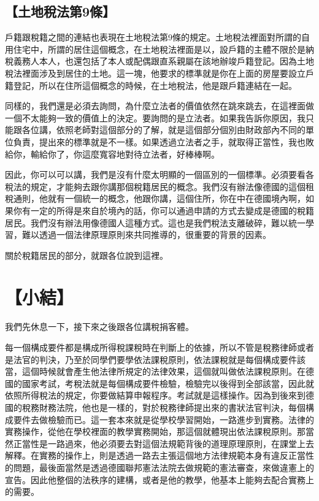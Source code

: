 \documentclass[]{ctexbook}
\begin{document}
\hypertarget{ux571fux5730ux7a05ux6cd5ux7b2c9ux689d}{%
\subsection{【土地稅法第9條】}\label{ux571fux5730ux7a05ux6cd5ux7b2c9ux689d}}

戶籍跟稅籍之間的連結也表現在土地稅法第9條的規定。土地稅法裡面對所謂的自用住宅中，所謂的居住這個概念，在土地稅法裡面是以，設戶籍的主體不限於是納稅義務人本人，也還包括了本人或配偶跟直系親屬在該地辦竣戶籍登記。因為土地稅法裡面涉及到居住的土地。這一塊，他要求的標準就是你在上面的房屋要設立戶籍登記，所以在住所這個概念的時候，在土地稅法，他是跟戶籍連結在一起。

同樣的，我們還是必須去詢問，為什麼立法者的價值依然在跳來跳去，在這裡面做一個不太能夠一致的價值上的決定。要詢問的是立法者。如果我告訴你原因，我只能跟各位講，依照老師對這個部分的了解，就是這個部分個別由財政部內不同的單位負責，提出來的標準就是不一樣。如果透過立法者之手，就取得正當性，我也敗給你，輸給你了，你這麼寬容地對待立法者，好棒棒啊。

因此，你可以可以講，我們是沒有什麼太明顯的一個區別的一個標準。必須要看各稅法的規定，才能夠去跟你講那個稅籍居民的概念。我們沒有辦法像德國的這個租稅通則，他就有一個統一的概念，他跟你講，這個住所，你在中在德國境內啊，如果你有一定的所得是來自於境內的話，你可以通過申請的方式去變成是德國的稅籍居民。我們沒有辦法用像德國人這種方式。這也是我們稅法支離破碎，難以統一學習，難以透過一個法律原理原則來共同推導的，很重要的背景的因素。

關於稅籍居民的部分，就跟各位說到這裡。

\hypertarget{ux5c0fux7d50}{%
\section{【小結】}\label{ux5c0fux7d50}}

我們先休息一下，接下來之後跟各位講稅捐客體。

每一個構成要件都是構成所得稅課稅時在判斷上的依據，所以不管是稅務律師或者是法官的判決，乃至於同學們要學依法課稅原則，依法課稅就是每個構成要件該當，這個時候就會產生他法律所規定的法律效果，這個就叫做依法課稅原則。在德國的國家考試，考稅法就是每個構成要件檢驗，檢驗完以後得到全部該當，因此就依照所得稅法的規定，你要做結算申報程序。考試就是這樣操作。因為到後來到德國的稅務財務法院，他也是一樣的，對於稅務律師提出來的書狀法官判決，每個構成要件去做檢驗而已。這一套本來就是從學校學習開始，一路進步到實務。法律的實務操作，從他在學校裡面的教學實務開始，那這個就體現出依法課稅原則。那當然正當性是一路過來，他必須要去對這個法規範背後的道理原理原則，在課堂上去解釋。在實務的操作上，則是透過一路去主張這個地方法律規範本身有違反正當性的問題，最後面當然是透過德國聯邦憲法法院去做規範的憲法審查，來做違憲上的宣告。因此他整個的法秩序的建構，或者是他的教學，他基本上能夠去配合實務上的需要。
\end{document}
